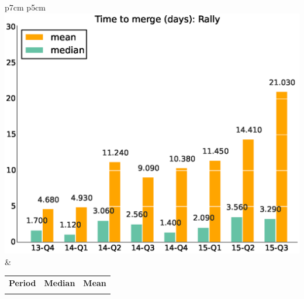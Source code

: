\documentclass[a4wide,11pt]{article}
\begin{document}
\begin{tabular}{p{7cm} p{5cm}}
    \vspace{0pt} 
    \includegraphics[scale=.35]{figs/timetoreview_medianRally.eps}
    & 
    \vspace{0pt}
    \begin{tabular}{l|r|r|}%
    \bfseries Period & \bfseries Median & \bfseries Mean %
    \csvreader[head to column names]{data/timetoreview_medianRally.csv}{}%
    {\\ & \mediantime & \meantime}
    \end{tabular}
\end{tabular}
\end{document}
